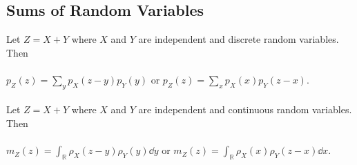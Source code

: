 \documentclass{article}
\begin{document}
		\subsection{Sums of Random Variables}
			Let $Z = X + Y$ where $X$ and $Y$ are independent and discrete random variables. Then \\
			\\
			$p_Z(z) = \sum_y p_X(z - y) p_Y(y)$ \quad or \quad $p_Z(z) = \sum_x p_X(x) p_Y(z - x)$. \\
			\\
			Let $Z = X + Y$ where $X$ and $Y$ are independent and continuous random variables. Then \\
			\\
			$m_Z(z) = \int_{\mathbb{R}} \rho_X(z - y) \rho_Y(y) \dd{y}$ \quad or \quad $m_Z(z) = \int_{\mathbb{R}} \rho_X(x) \rho_Y(z - x) \dd{x}$. \\
		
\end{document}
